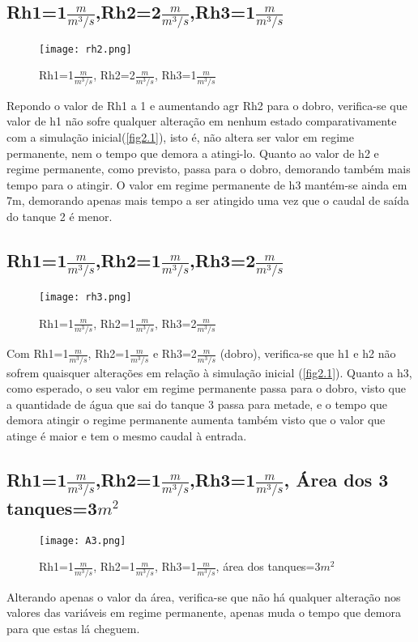 \documentclass[11pt]{article}
\begin{document}
\subsection{Rh1=1$\frac{m}{m^3/s}$,Rh2=2$\frac{m}{m^3/s}$,Rh3=1$\frac{m}{m^3/s}$}
\begin{figure}[!h]
\texttt{[image: rh2.png]}
\caption{Rh1=1$\frac{m}{m^3/s}$, Rh2=2$\frac{m}{m^3/s}$, Rh3=1$\frac{m}{m^3/s}$}
\label{fig2.3}
\end{figure}
Repondo o valor de Rh1 a 1 e aumentando agr Rh2 para o dobro, verifica-se que valor de h1 não sofre qualquer alteração em nenhum estado comparativamente com a simulação inicial(\ref{fig2.1}), isto é, não altera ser valor em regime permanente, nem o tempo que demora a atingi-lo. Quanto ao valor de h2 e regime permanente, como previsto, passa para o dobro, demorando também mais tempo para o atingir. O valor em regime permanente de h3 mantém-se ainda em 7m, demorando apenas mais tempo a ser atingido uma vez que o caudal de saída do tanque 2 é menor. 

\pagebreak
\subsection{Rh1=1$\frac{m}{m^3/s}$,Rh2=1$\frac{m}{m^3/s}$,Rh3=2$\frac{m}{m^3/s}$}
\begin{figure}[!h]
\texttt{[image: rh3.png]}
\caption{Rh1=1$\frac{m}{m^3/s}$, Rh2=1$\frac{m}{m^3/s}$, Rh3=2$\frac{m}{m^3/s}$}
\label{fig2.4}
\end{figure}
Com Rh1=1$\frac{m}{m^3/s}$, Rh2=1$\frac{m}{m^3/s}$ e Rh3=2$\frac{m}{m^3/s}$ (dobro), verifica-se que h1 e h2 não sofrem quaisquer alterações em relação à simulação inicial (\ref{fig2.1}). Quanto a h3, como esperado, o seu valor em regime permanente passa para o dobro, visto que a quantidade de água que sai do tanque 3 passa para metade, e o tempo que demora atingir o regime permanente aumenta também visto que o valor que atinge é maior e tem o mesmo caudal à entrada.
\pagebreak
\subsection{Rh1=1$\frac{m}{m^3/s}$,Rh2=1$\frac{m}{m^3/s}$,Rh3=1$\frac{m}{m^3/s}$, Área dos 3 tanques=3$m^2$}
\begin{figure}[!h]
\texttt{[image: A3.png]}
\caption{Rh1=1$\frac{m}{m^3/s}$, Rh2=1$\frac{m}{m^3/s}$, Rh3=1$\frac{m}{m^3/s}$, área dos tanques=3$m^2$}
\label{fig2.5}
\end{figure}
Alterando apenas o valor da área, verifica-se que não há qualquer alteração nos valores das variáveis em regime permanente, apenas muda o tempo que demora para que estas lá cheguem.
\end{document}
